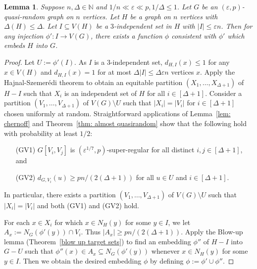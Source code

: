 \documentclass[a4paper, 11pt, reqno]{amsart}
\newtheorem{lemma}[definition]{Lemma}
\numberwithin{equation}{section}
\newcommand{\1}{{\rm 1\hspace*{-0.4ex}%
\rule{0.1ex}{1.52ex}\hspace*{0.2ex}}}
\newcommand{\N}{\mathbb N}
\renewcommand{\epsilon}{\varepsilon}
\newcommand{\sub}{\subseteq}
\begin{document}
\begin{lemma}\label{blow up with pre-embedding}
Suppose $n,\Delta\in \N$ and $1/n\ll\epsilon\ll p,1/\Delta \leq 1$.
Let $G$ be an $(\epsilon,p)$-quasi-random graph on $n$ vertices. 
Let $H$ be a graph on $n$ vertices with $\Delta(H)\leq \Delta$.
Let $I\sub V(H)$ be a $3$-independent set in $H$ with $|I|\leq \epsilon n$.
Then for any injection $\phi':I\to V(G)$, 
there exists a function $\phi$ consistent with $\phi'$ which embeds $H$ into $G$.
\end{lemma}
\begin{proof}
Let $U:=\phi'(I)$. 
As $I$ is a $3$-independent set,  $d_{H,I}(x)\leq 1$ for any $x\in V(H)$ and $d_{H,I}(x)=1$ for at most $\Delta|I|\leq \Delta \epsilon n$ vertices $x$.
Apply the Hajnal-Szemer\'edi theorem to obtain an equitable partition $(X_1,\dots, X_{\Delta+1})$ of $H-I$ such that $X_i$ is an independent set of $H$ for all $i\in [\Delta+1]$.
Consider a partition $(V_1,\dots, V_{\Delta+1})$ of $V(G)\setminus U$ such that $|X_i|=|V_i|$ for $i\in [\Delta+1]$ chosen uniformly at random.
Straightforward applications of Lemma~\ref{lem: chernoff} and Theorem~\ref{thm: almost quasirandom} show
that the following hold with probability at least $1/2$:
\begin{itemize}
\item[(GV1)] $G[V_i,V_j]$ is $(\epsilon^{1/7},p)$-super-regular for all distinct $i,j\in [\Delta+1]$, and
\item[(GV2)] $d_{G,V_i}(u) \geq pn/(2(\Delta+1))$ for all $u\in U$ and $i\in [\Delta+1]$.
\end{itemize}
In particular, there exists a partition $(V_1,\dots, V_{\Delta+1})$ of $V(G)\setminus U$ such that $|X_i|=|V_i|$ and both (GV1) and (GV2) hold. 

For each $x\in X_i$ for which $x\in N_{H}(y)$ for some $y\in I$, 
we let $A_x:=N_{G}(\phi'(y))\cap V_i$.
Thus $|A_x|\geq pn/(2(\Delta+1))$. Apply the Blow-up lemma (Theorem~\ref{blow up target sets}) to find an embedding $\phi''$ of $H-I$ into $G-U$ such that $\phi''(x) \in A_x \subseteq  N_{G}(\phi'(y))$ 
whenever $x\in N_H(y)$ for some $y\in I$. 
Then we obtain the desired embedding $\phi$ by defining $\phi:=\phi'\cup \phi''$.
\end{proof}
\end{document}
